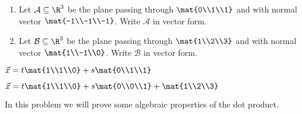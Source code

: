 \begin{exercises}
\begin{problist}
		\prob
		\begin{enumerate}
			\item Let $\mathcal A\subseteq \R^3$ be the plane passing through $\mat{0\\1\\1}$
			and with normal vector $\mat{-1\\-1\\-1}$. Write $\mathcal A$ in vector form.
			\item Let $\mathcal B\subseteq \R^3$ be the plane passing through $\mat{1\\2\\3}$
			and with normal vector $\mat{1\\-1\\0}$. Write $\mathcal B$ in vector form.
		\end{enumerate}
		\begin{solution}
			\begin{enumerate*} 
				\item $\vec x = t\mat{1\\1\\0}+s\mat{0\\1\\1}$
				\item $\vec x = t\mat{1\\1\\0}+s\mat{0\\0\\1}+\mat{1\\2\\3}$ 
			\end{enumerate*}
		\end{solution}
		
		\prob In this problem we will prove some algebraic properties of the dot product.
		\begin{enumerate}
			

\end{enumerate}
\end{problist}
\end{exercises}
